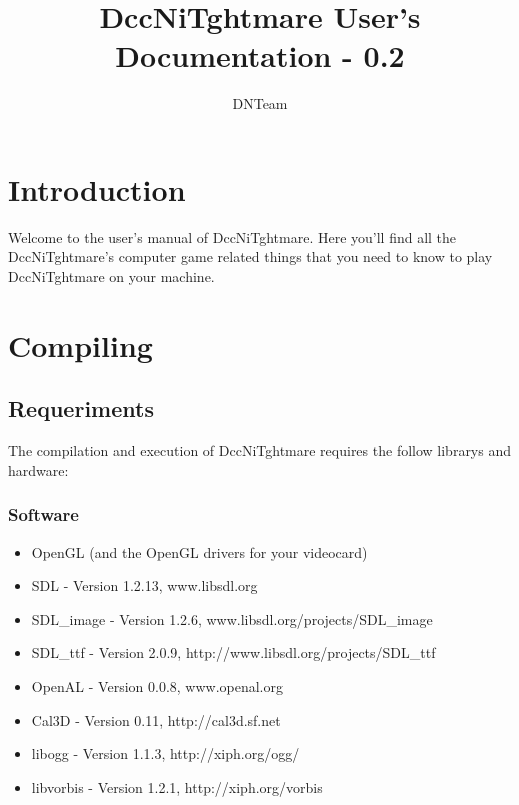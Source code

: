 \documentclass[ letterpaper,12pt]{article}
\begin{document}
\title{\textbf{DccNiTghtmare User's Documentation - 0.2}}

\author{
DNTeam
}

\maketitle


\newpage

\tableofcontents

\newpage

\section{Introduction}

Welcome to the user's manual of DccNiTghtmare. Here you'll find all the
DccNiTghtmare's computer game related things that you need to know to play
DccNiTghtmare on your machine. 

\section{Compiling}

\subsection{Requeriments}

The compilation and execution of DccNiTghtmare requires the follow librarys and hardware:

\subsubsection{Software}
\begin{itemize}
\item{OpenGL (and the OpenGL drivers for your videocard)}
\item{SDL - Version 1.2.13, www.libsdl.org}
\item{SDL\_image - Version 1.2.6, www.libsdl.org/projects/SDL\_image}
\item{SDL\_ttf - Version 2.0.9, http://www.libsdl.org/projects/SDL\_ttf}
\item{OpenAL - Version 0.0.8, www.openal.org }
\item{Cal3D - Version 0.11, http://cal3d.sf.net}
\item{libogg - Version 1.1.3, http://xiph.org/ogg/}
\item{libvorbis - Version 1.2.1, http://xiph.org/vorbis}
\end{itemize}
\end{document}
